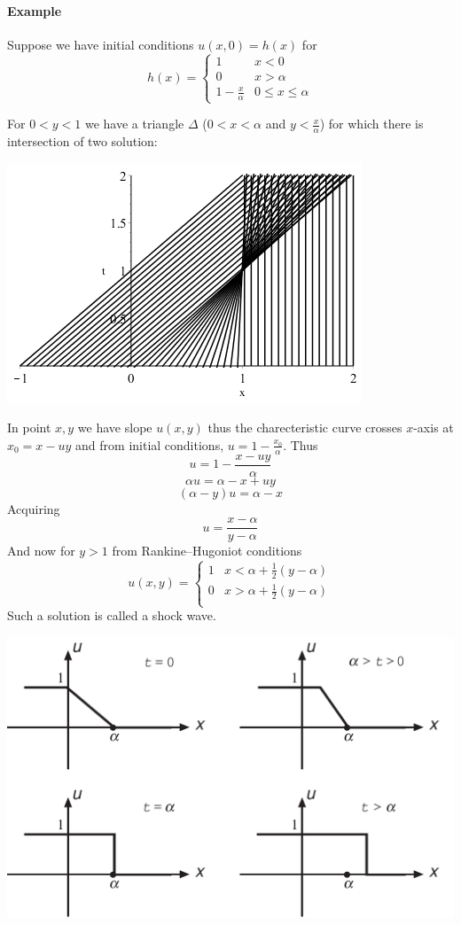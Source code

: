 \paragraph{Example}
Suppose we have initial conditions $u(x,0) = h(x)$ for
$$h(x) = \begin{cases}
1 & x < 0\\
0 & x> \alpha\\
1-\frac{x}{\alpha} & 0\leq x \leq \alpha
\end{cases}$$

For $0<y<1$ we have a triangle $\Delta$ ($0<x<\alpha$ and $y < \frac{x}{\alpha}$) for which there is intersection of two solution:

\begin{center}
	\includegraphics[width=0.5\linewidth]{./lect2/p2.png}
\end{center}

In point $x,y$ we have slope $u(x,y)$ thus the charecteristic curve crosses $x$-axis at $x_0 = x-uy$ and from initial conditions, $u=1-\frac{x_0}{\alpha}$. Thus
$$u=1-\frac{x-uy}{\alpha}$$
$$\alpha u=\alpha-x+uy$$
$$(\alpha-y) u=\alpha-x$$
Acquiring
$$u = \frac{x-\alpha}{y-\alpha}$$
And now for $y>1$ from Rankine–Hugoniot conditions
$$u(x,y) = \begin{cases}
1 & x<\alpha + \frac{1}{2} (y-\alpha)\\
0 & x>\alpha + \frac{1}{2} (y-\alpha)\\
\end{cases}$$
Such a solution is called a shock wave.

\begin{center}
	\includegraphics[width=0.7\linewidth]{./lect2/p1.png}
\end{center}


